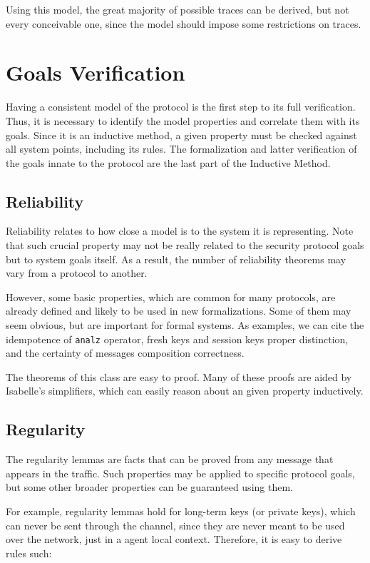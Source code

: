 Using this model, the great majority of possible traces can be derived, but not every conceivable one, since the model should impose some restrictions on traces.





\section{Goals Verification}
Having a consistent model of the protocol is the first step to its full verification. Thus, it is necessary to identify the model properties and correlate them with its goals. Since it is an inductive method, a given property must be checked against all system points, including its rules. The formalization and latter verification of the goals innate to the protocol are the last part of the Inductive Method.

\subsection{Reliability}
Reliability relates to how close a model is to the system it is representing. Note that such crucial property may not be really related to the security protocol goals but to system goals itself. As a result, the number of reliability theorems may vary from a protocol to another.

However, some basic properties, which are common for many protocols, are already defined and likely to be used in new formalizations. Some of them may seem obvious, but are important for formal systems. As examples, we can cite the idempotence of \texttt{analz} operator, fresh keys and session keys proper distinction, and the certainty of messages composition correctness.

The theorems of this class are easy to proof. Many of these proofs are aided by Isabelle's simplifiers, which can easily reason about an given property inductively.

\subsection{Regularity}
The regularity lemmas are facts that can be proved from any message that appears in the traffic. Such properties may be applied to specific protocol goals, but some other broader properties can be guaranteed using them.

For example, regularity lemmas hold for long-term keys (or private keys), which can never be sent through the channel, since they are never meant to be used over the network, just in a agent local context. Therefore, it is easy to derive rules such:

